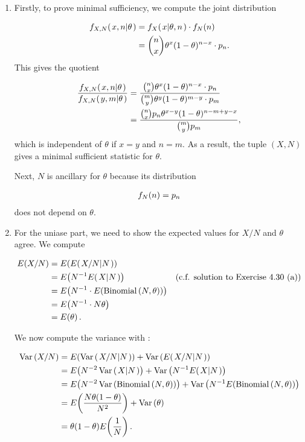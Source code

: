 \documentclass[12pt,letterpaper,reqno]{amsart}
\numberwithin{equation}{subsection}
\begin{document}
\begin{enumerate}[label=(\alph*),leftmargin=*]
    \item Firstly, to prove minimal sufficiency, we compute the joint distribution
    
    \begin{align*}
        {f_{X,N}}\! \left( {\left. {x,n} \middle| {\theta} \right.} \right) &= {f_X}\! \left( {\left. {x} \middle| {\theta, n} \right.} \right) \cdot {f_N}\! \left( {n} \right) \\
        &= \binom{n}{x} \theta^x (1-\theta)^{n-x} \cdot p_n.
    \end{align*}
    This gives the quotient
    
    \begin{align*}
        \frac{{f_{X,N}}\! \left( {\left. {x,n} \middle| {\theta} \right.} \right)}{{f_{X,N}}\! \left( {\left. {y,m} \middle| {\theta} \right.} \right)} &= \frac{ \binom{n}{x} \theta^x (1-\theta)^{n-x} \cdot p_n}{\binom{m}{y} \theta^y (1-\theta)^{m-y} \cdot p_m} \\
        &= \frac{\binom{n}{x}p_n \theta^{x-y} (1-\theta)^{n-m+y-x}}{\binom{m}{y}p_m},
    \end{align*}
    which is independent of $\theta$ if $x = y$ and $n = m$. As a result, the tuple $(X, N)$ gives a minimal sufficient statistic for $\theta$.
    
    Next, $N$ is ancillary for $\theta$ because its distribution
    
    \begin{align*}
        {f_N}\! \left( {n} \right) = p_n
    \end{align*}
    does not depend on $\theta$.
    
    \item For the uniase part, we need to show the expected values for $X/N$ and $\theta$ agree. We compute
    
    \begin{align*}
        \fun{E}{X/N} &= \fun{E}{\fun{E}{\conditbar{X/N}{N}}} \\
        &= \fun{E}{N^{-1} \fun{E}{\conditbar{X}{N}}} & \left( \mbox{c.f. solution to Exercise 4.30 (a)} \right) \\
        &= \fun{E}{N^{-1} \cdot \fun{E}{\binomdist{N, \theta}}} \\
        &= \fun{E}{N^{-1} \cdot N\theta} \\
        &= \fun{E}{\theta}.
    \end{align*}
    
    We now compute the variance with \cite[Theorem 4.4.7 page 167]{Berger-Casella}:
    
    \begin{align*}
        \Var{X/N} &= \fun{E}{\Var{\conditbar{X/N}{N}}} + \Var{\fun{E}{\conditbar{X/N}{N}}} \\
        &= \fun{E}{N^{-2} \Var{\conditbar{X}{N}}} + \Var{N^{-1} \fun{E}{\conditbar{X}{N}}} \\
        &= \fun{E}{N^{-2} \Var{\binomdist{N, \theta}}} + \Var{N^{-1} \fun{E}{\binomdist{N, \theta}}} \\
        &= \fun{E}{\frac{N\theta (1-\theta)}{N^2}} + \Var{\theta} \\
        &= \theta (1-\theta) \fun{E}{\frac{1}{N}}.
    \end{align*}
\end{enumerate}
\end{document}
